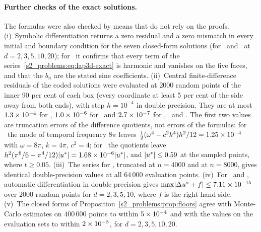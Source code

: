 \paragraph{Further checks of the exact solutions.}
The formulas were also checked by means that do not rely on the proofs.
(i)~Symbolic differentiation returns a zero residual and a zero mismatch in every initial
and boundary condition for the seven closed-form solutions (for \Pone\ and \Ptwo\ at
$d=2,3,5,10,20$); for \PLthree\ it confirms that every term of the
series~\eqref{s2_problems:eq:lap3d-exact} is harmonic and vanishes on the five faces, and
that the $b_n$ are the stated sine coefficients.
(ii)~Central finite-difference residuals of the coded solutions were evaluated at $2000$
random points of the inner 90 per cent of each box (every coordinate at least 5 per cent
of the side away from both ends), with step $h=10^{-4}$ in double precision. They are at
most $1.3\times 10^{-4}$ for \PWone, $1.0\times 10^{-6}$ for \PH\ and $2.7\times 10^{-7}$ for \PWtwo,
\PLtwo\ and \PLthree. The first two values are truncation errors of the difference
quotients, not errors of the formulas: for \PWone\ the mode of temporal frequency $8\pi$
leaves $\tfrac12(\omega^4-c^2k^4)h^2/12=1.25\times 10^{-4}$ with $\omega=8\pi$, $k=4\pi$,
$c^2=4$; for \PH\ the quotients leave $h^2(\pi^6/6+\pi^4/12)\lvert u^{*}\rvert=1.68\times 10^{-6}\lvert u^{*}\rvert$,
and $\lvert u^{*}\rvert\le0.59$ at the sampled points, where $t\ge0.05$.
(iii)~The series for \PLthree, truncated at $n=4000$ and at $n=8000$, gives identical
double-precision values at all $64\,000$ evaluation points.
(iv)~For \Pone\ and \Ptwo, automatic differentiation in double precision gives
$\max\lvert \Delta u^{*}+f\rvert\le7.11\times 10^{-15}$ over $2000$ random points for $d=2,3,5,10$, where $f$
is the right-hand side.
(v)~The closed forms of Proposition~\ref{s2_problems:prop:floors} agree with Monte-Carlo
estimates on $400\,000$ points to within $5\times 10^{-4}$ and with the values on the evaluation
sets to within $2\times 10^{-3}$, for $d=2,3,5,10,20$.

